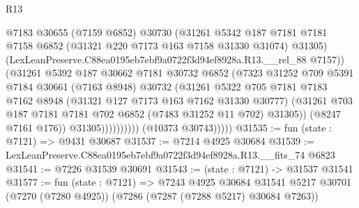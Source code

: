 \begin{lexlean}{R13}
\begin{coremodule}
                                @7183
                                @30655
                                (@7159 @6852)
                                @30730
                                (@31261
                                  @5342
                                  @187
                                  @7181
                                  @7181
                                  @7158
                                  @6852
                                  (@31321 @220 @7173 @163 @7158 @31330 @31074)
                                  @31305)
                                (LexLeanPreserve.C88ea0195eb7ebf9a0722f3d94ef8928a.R13.__rel_88
                                  @7157))
                              (@31261
                                @5392
                                @187
                                @30662
                                @7181
                                @30732
                                @6852
                                (@7323
                                  @31252
                                  @709
                                  @5391
                                  @7184
                                  @30661
                                  (@7163 @8948)
                                  @30732
                                  (@31261
                                    @5322
                                    @705
                                    @7181
                                    @7183
                                    @7162
                                    @8948
                                    (@31321 @127 @7173 @163 @7162 @31330 @30777)
                                    (@31261
                                      @703
                                      @187
                                      @7181
                                      @7181
                                      @702
                                      @6852
                                      (@7483 @31252 @11 @702)
                                      @31305))
                                  (@8247 @7161 @176))
                                @31305))))))))))
            (@10373 @30743)))))
@31535 := fun (state : @7121) => @9431 @30687
@31537 := @7214 @4925 @30684
@31539 := LexLeanPreserve.C88ea0195eb7ebf9a0722f3d94ef8928a.R13.__fits_74 @6823
@31541 := @7226 @31539 @30691
@31543 := (state : @7121) -> @31537 @31541
@31577 := fun (state : @7121) =>
  @7243
    @4925
    @30684
    @31541
    @5217
    @30701
    (@7270 (@7280 @4925))
    (@7286 (@7287 (@7288 @5217) @30684 @7263))

\end{coremodule}
\end{lexlean}
